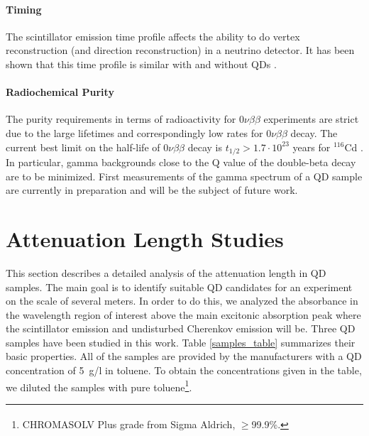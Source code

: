 \documentclass[cits]{JINST}
\begin{document}
\paragraph{Timing}
The scintillator emission time profile affects the ability to do vertex reconstruction (and direction reconstruction) in a neutrino detector. It has been shown that this time profile is similar with and without QDs \cite{mitpaper}. 

\paragraph{Radiochemical Purity}
The purity requirements in terms of radioactivity for 0$\nu\beta\beta$ experiments are strict due to the large lifetimes and correspondingly low rates for 0$\nu\beta\beta$ decay. The current best limit on the half-life of 0$\nu\beta\beta$ decay is $t_{1/2}>1.7\cdot10^{23}$ years for $^{116}$Cd \cite{solotvina}. In particular, gamma backgrounds close to the Q value of the double-beta decay are to be minimized. First measurements of the gamma spectrum of a QD sample are currently in preparation and will be the subject of future work.   

\section{Attenuation Length Studies}\label{Attenuation_length_section}
This section describes a detailed analysis of the attenuation length in QD samples. The main goal is to identify suitable QD candidates for an experiment on the scale of several meters. In order to do this, we analyzed the absorbance in the wavelength region of interest above the main excitonic absorption peak where the scintillator emission and undisturbed Cherenkov emission will be. Three QD samples have been studied in this work. Table \ref{samples_table} summarizes their basic properties. All of the samples are provided by the manufacturers with a QD concentration of 5~g/l in toluene. To obtain the concentrations given in the table, we diluted the samples with pure toluene\footnote{CHROMASOLV\textsuperscript{\textregistered} Plus grade from Sigma Aldrich, $\geq$99.9\%.}.
\end{document}
